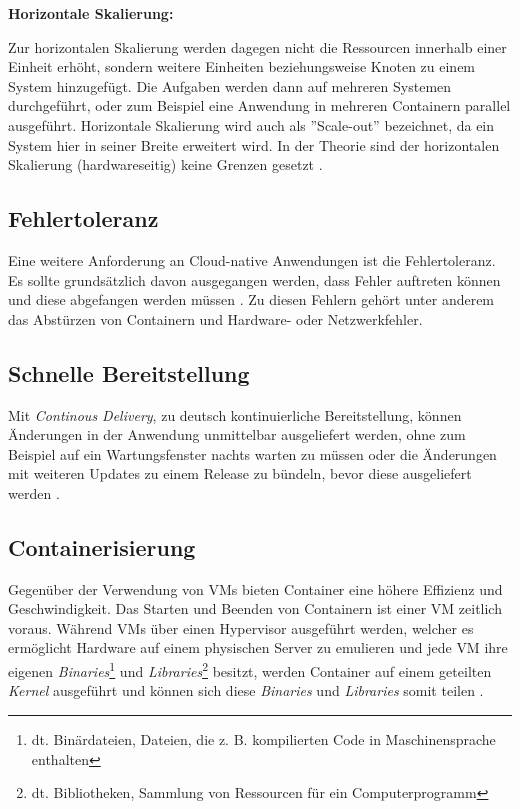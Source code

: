 \textbf{Horizontale Skalierung:}

Zur horizontalen Skalierung werden dagegen nicht die Ressourcen innerhalb einer Einheit erhöht, sondern weitere Einheiten beziehungsweise Knoten zu einem System hinzugefügt. Die Aufgaben werden dann auf mehreren Systemen durchgeführt, oder zum Beispiel eine Anwendung in mehreren Containern parallel ausgeführt. Horizontale Skalierung wird auch als ''Scale-out'' bezeichnet, da ein System hier in seiner Breite erweitert wird. In der Theorie sind der horizontalen Skalierung (hardwareseitig) keine Grenzen gesetzt \cite[Vgl.][]{Geißler2019}\cite[Vgl.][]{VMware}.

\subsection{Fehlertoleranz}
Eine weitere Anforderung an Cloud-native Anwendungen ist die Fehlertoleranz. Es sollte grundsätzlich davon ausgegangen werden, dass Fehler auftreten können und diese abgefangen werden müssen \cite[Vgl.][S. 17]{Gannon2017}. Zu diesen Fehlern gehört unter anderem das Abstürzen von Containern und Hardware- oder Netzwerkfehler.

\subsection{Schnelle Bereitstellung}
Mit \textit{Continous Delivery}, zu deutsch kontinuierliche Bereitstellung, können Änderungen in der Anwendung unmittelbar ausgeliefert werden, ohne zum Beispiel auf ein Wartungsfenster nachts warten zu müssen oder die Änderungen mit weiteren Updates zu einem Release zu bündeln, bevor diese ausgeliefert werden \cite[Vgl.][]{VMwareb}. \pagebreak

\subsection{Containerisierung}
Gegenüber der Verwendung von \acp{VM} bieten Container eine höhere Effizienz und Geschwindigkeit. Das Starten und Beenden von Containern ist einer \ac{VM} zeitlich voraus. \cite[Vgl.][]{VMwareb}
Während \acp{VM} über einen Hypervisor ausgeführt werden, welcher es ermöglicht Hardware auf einem physischen Server zu emulieren und jede \ac{VM} ihre eigenen \textit{Binaries}\footnote{dt. Binärdateien, Dateien, die z. B. kompilierten Code in Maschinensprache enthalten} und \textit{Libraries}\footnote{dt. Bibliotheken, Sammlung von Ressourcen für ein Computerprogramm} besitzt, werden Container auf einem geteilten \textit{Kernel} ausgeführt und können sich diese \textit{Binaries} und \textit{Libraries} somit teilen \cite[Vgl.][]{Jones2018}.

